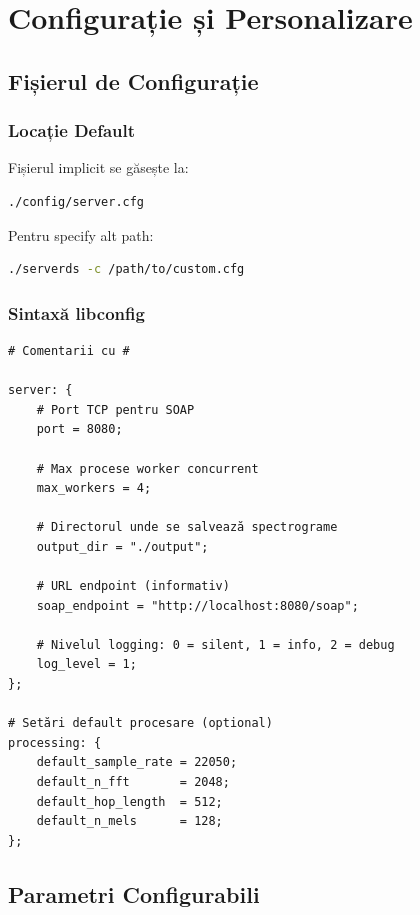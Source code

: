 \documentclass[12pt,a4paper,oneside]{book}
\begin{document}
\chapter{Configurație și Personalizare}

\section{Fișierul de Configurație}

\subsection{Locație Default}

Fișierul implicit se găsește la:
\begin{lstlisting}
./config/server.cfg
\end{lstlisting}

Pentru specify alt path:
\begin{lstlisting}[language=bash]
./serverds -c /path/to/custom.cfg
\end{lstlisting}

\subsection{Sintaxă libconfig}

\begin{lstlisting}[caption=Exemplu configurație completă]
# Comentarii cu #

server: {
    # Port TCP pentru SOAP
    port = 8080;
    
    # Max procese worker concurrent
    max_workers = 4;
    
    # Directorul unde se salvează spectrograme
    output_dir = "./output";
    
    # URL endpoint (informativ)
    soap_endpoint = "http://localhost:8080/soap";
    
    # Nivelul logging: 0 = silent, 1 = info, 2 = debug
    log_level = 1;
};

# Setări default procesare (optional)
processing: {
    default_sample_rate = 22050;
    default_n_fft       = 2048;
    default_hop_length  = 512;
    default_n_mels      = 128;
};
\end{lstlisting}

\section{Parametri Configurabili}
\end{document}
